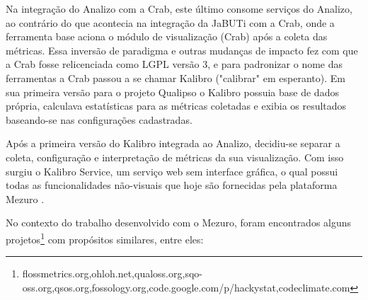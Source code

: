 Na integração do Analizo com a Crab, este último consome serviços do Analizo, ao contrário do que acontecia na integração da JaBUTi com a Crab, onde a ferramenta base aciona o módulo de visualização (Crab) após a coleta das métricas. Essa inversão de paradigma e outras mudanças de impacto fez com que a Crab fosse relicenciada como LGPL versão 3, e para padronizar o nome das ferramentas a Crab passou a se chamar Kalibro ("calibrar" em esperanto). Em sua primeira versão para o projeto Qualipso o Kalibro possuia base de dados própria, calculava estatísticas para as métricas coletadas e exibia os resultados baseando-se nas configurações cadastradas. 

Após a primeira versão do Kalibro integrada ao Analizo, decidiu-se separar a coleta, configuração e interpretação de métricas da sua visualização. Com isso surgiu o Kalibro Service, um serviço web sem interface gráfica, o qual possui todas as funcionalidades não-visuais que hoje são fornecidas pela plataforma Mezuro \cite{meirelles2013metrics}.

No contexto do trabalho desenvolvido com o Mezuro, foram encontrados alguns projetos\footnote{flossmetrics.org,ohloh.net,qualoss.org,sqo-oss.org,qsos.org,fossology.org,code.google.com/p/hackystat,codeclimate.com} com propósitos similares\cite{meirelles2010mezuro}, entre eles:

